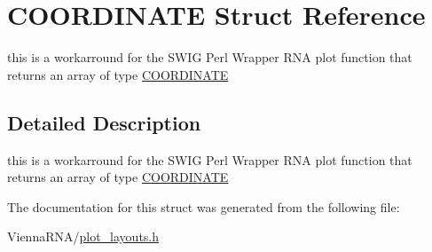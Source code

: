\hypertarget{structCOORDINATE}{}\section{C\+O\+O\+R\+D\+I\+N\+A\+TE Struct Reference}
\label{structCOORDINATE}


this is a workarround for the S\+W\+IG Perl Wrapper R\+NA plot function that returns an array of type \mbox{\hyperlink{structCOORDINATE}{C\+O\+O\+R\+D\+I\+N\+A\+TE}}  




\subsection{Detailed Description}
this is a workarround for the S\+W\+IG Perl Wrapper R\+NA plot function that returns an array of type \mbox{\hyperlink{structCOORDINATE}{C\+O\+O\+R\+D\+I\+N\+A\+TE}} 

The documentation for this struct was generated from the following file\+:\begin{DoxyCompactItemize}
\item 
Vienna\+R\+N\+A/\mbox{\hyperlink{plot__layouts_8h}{plot\+\_\+layouts.\+h}}\end{DoxyCompactItemize}
